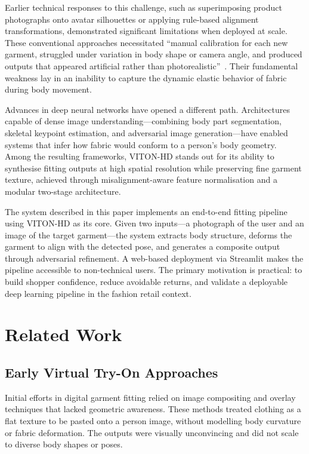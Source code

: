 \documentclass[conference]{IEEEtran}
\begin{document}
Earlier technical responses to this challenge, such as superimposing product photographs onto avatar silhouettes or applying rule-based alignment transformations, demonstrated significant limitations when deployed at scale. These conventional approaches necessitated ``manual calibration for each new garment, struggled under variation in body shape or camera angle, and produced outputs that appeared artificial rather than photorealistic''~\cite{b1}. Their fundamental weakness lay in an inability to capture the dynamic elastic behavior of fabric during body movement.

Advances in deep neural networks have opened a different path. Architectures capable of dense image understanding—combining body part segmentation, skeletal keypoint estimation, and adversarial image generation—have enabled systems that infer how fabric would conform to a person's body geometry. Among the resulting frameworks, VITON-HD \cite{b1} stands out for its ability to synthesise fitting outputs at high spatial resolution while preserving fine garment texture, achieved through misalignment-aware feature normalisation and a modular two-stage architecture.

The system described in this paper implements an end-to-end fitting pipeline using VITON-HD as its core. Given two inputs—a photograph of the user and an image of the target garment—the system extracts body structure, deforms the garment to align with the detected pose, and generates a composite output through adversarial refinement. A web-based deployment via Streamlit makes the pipeline accessible to non-technical users. The primary motivation is practical: to build shopper confidence, reduce avoidable returns, and validate a deployable deep learning pipeline in the fashion retail context.

\section{Related Work}

\subsection{Early Virtual Try-On Approaches}

Initial efforts in digital garment fitting relied on image compositing and overlay techniques that lacked geometric awareness. These methods treated clothing as a flat texture to be pasted onto a person image, without modelling body curvature or fabric deformation. The outputs were visually unconvincing and did not scale to diverse body shapes or poses.
\end{document}
